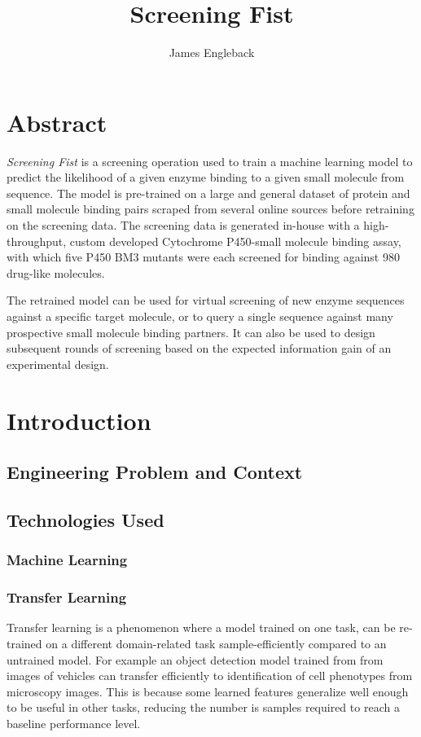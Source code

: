\documentclass{article}
\begin{document}
\title{\textbf{Screening Fist}}
\author{James Engleback}
\maketitle
\tableofcontents

\section{Abstract}
\textit{Screening Fist} is a screening operation used to train a machine learning model to predict the likelihood of a given enzyme binding to a given small molecule from sequence.
The model is pre-trained on a large and general dataset of protein and small molecule binding pairs scraped from several online sources before retraining on the screening data.
The screening data is generated in-house with a high-throughput, custom developed Cytochrome P450-small molecule binding assay, with which five P450 BM3 mutants were each screened for binding against 980 drug-like molecules.
\par
The retrained model can be used for virtual screening of new enzyme sequences against a specific target molecule, or to query a single sequence against many prospective small molecule binding partners.
It can also be used to design subsequent rounds of screening based on the expected information gain of an experimental design.

\section{Introduction}

\subsection{Engineering Problem and Context}
\subsection{Technologies Used}
\subsubsection{Machine Learning}
\subsubsection{Transfer Learning}

Transfer learning is a phenomenon where a model trained on one task, can be re-trained on a different domain-related task  sample-efficiently compared to an untrained model.
For example an object detection model trained from from images of vehicles can transfer efficiently to identification of cell phenotypes from microscopy images.
This is because some learned features generalize well enough to be useful in other tasks, reducing the number is samples required to reach a baseline performance level.
\end{document}
